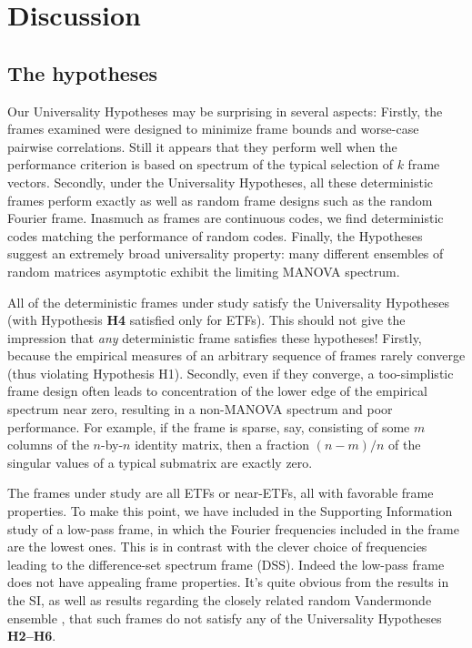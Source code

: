 \documentclass[a4paper,12pt]{article}
\begin{document}
\section*{Discussion}
\label{sec:discussion}

\subsection*{The hypotheses}

Our Universality Hypotheses may be surprising in several aspects:
Firstly, the frames examined were designed to minimize frame bounds and
worse-case pairwise correlations. Still it appears that they
perform well when the performance criterion is based on spectrum of the
typical selection of $k$ frame vectors. 
Secondly, under the Universality Hypotheses, all these deterministic frames
perform exactly as well as random frame designs such as the random Fourier
frame. Inasmuch as frames are continuous codes, we find deterministic codes
matching the performance of random codes. 
Finally, the Hypotheses suggest an extremely broad universality property: many
different ensembles of random matrices asymptotic exhibit the limiting
MANOVA spectrum.

All of the deterministic frames under study satisfy the Universality Hypotheses (with Hypothesis {\bf H4} satisfied only for ETFs). This should not give the impression that {\em any} deterministic frame satisfies these hypotheses! 
Firstly, because the empirical measures of an arbitrary sequence of frames rarely converge (thus violating Hypothesis H1). 
Secondly, even if they converge, a too-simplistic frame design often leads to concentration of the lower edge of the empirical spectrum near zero, resulting in a non-MANOVA spectrum and poor performance.
For example, if the frame is sparse, say, consisting of some $m$ columns of the $n$-by-$n$ identity matrix, then a fraction $(n-m)/n$ of the singular values of a typical submatrix are exactly zero. 

The frames under study are all ETFs or near-ETFs, all with favorable frame properties. 
To make this point, we have included in the Supporting Information \cite{SI}
study of a low-pass frame, in which the Fourier frequencies included in the frame are the lowest ones. This is in contrast with the clever choice of frequencies leading to the difference-set spectrum frame (DSS). Indeed the low-pass frame does not have appealing frame properties. It's quite obvious from the results in the SI, as well as results regarding the closely related random Vandermonde ensemble
\cite{VandermondeSpectrum}, that such frames do not satisfy any of the Universality Hypotheses {\bf H2--H6}.
\end{document}

